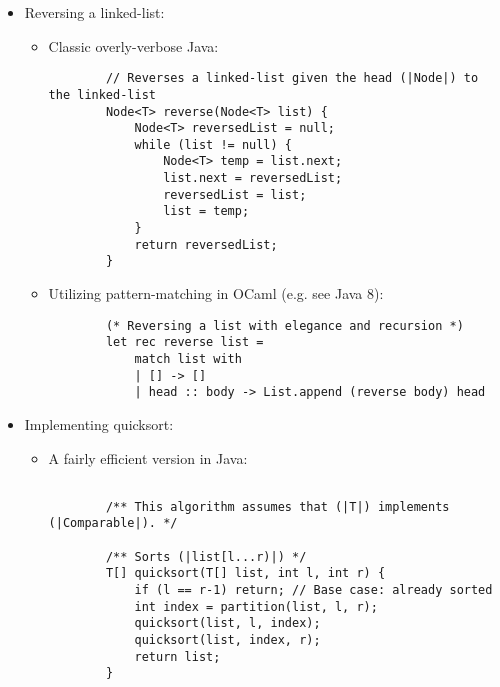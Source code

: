 \begin{itemize}
\begin{itemize}
    \ocaml
    \begin{lstlisting}
        (* Yields (|$\sum_{i=1}^{n} i^2$|) *)
        let rec sum_squares n =
            if n = 0 then 0
            else n*n + sum_squares (n-1)
    \end{lstlisting}
    \end{itemize}
    \item Reversing a linked-list:
    \begin{itemize}
    \item Classic overly-verbose \textsf{Java}:
    \java
    \begin{lstlisting}
        // Reverses a linked-list given the head (|Node|) to the linked-list
        Node<T> reverse(Node<T> list) {
            Node<T> reversedList = null;
            while (list != null) {
                Node<T> temp = list.next;
                list.next = reversedList;
                reversedList = list;
                list = temp;
            }
            return reversedList;
        }
    \end{lstlisting}
    \item Utilizing pattern-matching in \textsf{OCaml} (e.g. see \textsf{Java 8}):
    \ocaml
    \begin{lstlisting}
        (* Reversing a list with elegance and recursion *)
        let rec reverse list =
            match list with
            | [] -> []
            | head :: body -> List.append (reverse body) head
    \end{lstlisting}
    \end{itemize}
    \item Implementing quicksort:
    \begin{itemize}
    \item A fairly efficient version in \textsf{Java}:
    \java
    \begin{lstlisting}
        
        /** This algorithm assumes that (|T|) implements (|Comparable|). */
        
        /** Sorts (|list[l...r)|) */
        T[] quicksort(T[] list, int l, int r) {
            if (l == r-1) return; // Base case: already sorted
            int index = partition(list, l, r);
            quicksort(list, l, index);
            quicksort(list, index, r);
            return list;
        }
            

\end{lstlisting}
\end{itemize}
\end{itemize}
